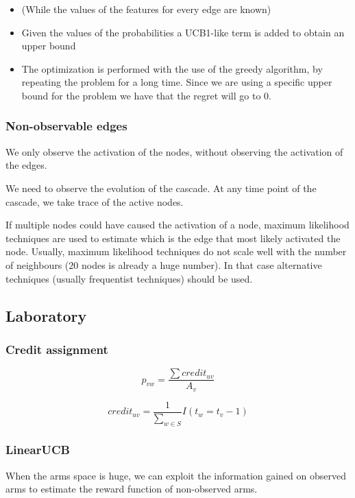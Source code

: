 \documentclass[10pt,a4paper]{article}
\begin{document}
\begin{itemize}
\item (While the values of the features for every edge are known)
\item Given the values of the probabilities a UCB1-like term is added to obtain an upper bound
\item The optimization is performed with the use of the greedy algorithm, by repeating the problem for a long time. Since we are using a specific  upper bound for the problem we have that the regret will go to $0$.
\end{itemize}

\subsubsection{Non-observable edges}\label{non-observable-edges}

We only observe the activation of the nodes, without observing the activation of the edges.

We need to observe the evolution of the cascade. At any time point of the cascade, we take trace of the active nodes.

If multiple nodes could have caused the activation of a node, maximum likelihood techniques are used to estimate which is the edge that most likely activated the node. Usually, maximum likelihood techniques do not scale well with the number of neighbours ($20$ nodes is already a huge number). In that case alternative techniques (usually frequentist techniques) should be used.

\subsection{Laboratory}\label{laboratory}

\subsubsection{Credit assignment}\label{credit-assignment}

$$p_{vw} = \frac{\sum{credit_{uv}}}{A_{v}}$$

$$credit_{uv} = \frac{1}{\sum_{w \in S}}{I(t_{w} = t_{v} - 1)}$$

\subsubsection{LinearUCB}\label{linearucb}

When the arms space is huge, we can exploit the information gained on observed arms to estimate the reward function of non-observed arms.
\newline
\end{document}

